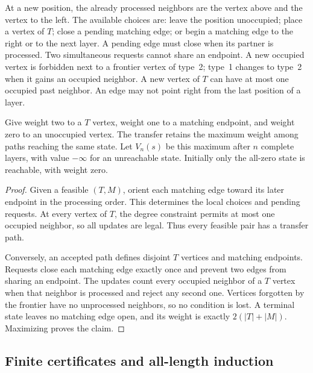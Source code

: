 \documentclass[11pt]{article}
\newtheorem{lemma}[theorem]{Lemma}
\theoremstyle{definition}
\theoremstyle{remark}
\newcommand{\Om}{\Omega}
\begin{document}
At a new position, the already processed neighbors are the vertex above
and the vertex to the left. The available choices are: leave the position
unoccupied; place a vertex of $T$; close a pending matching edge; or begin
a matching edge to the right or to the next layer. A pending edge must
close when its partner is processed. Two simultaneous requests cannot
share an endpoint. A new occupied vertex is forbidden next to a frontier
vertex of type~2; type~1 changes to type~2 when it gains an occupied
neighbor. A new vertex of $T$ can have at most one occupied past neighbor.
An edge may not point right from the last position of a layer.

Give weight two to a $T$ vertex, weight one to a matching endpoint, and
weight zero to an unoccupied vertex. The transfer retains the maximum
weight among paths reaching the same state. Let $V_n(s)$ be this maximum
after $n$ complete layers, with value $-\infty$ for an unreachable state.
Initially only the all-zero state is reachable, with weight zero.

\begin{proof}
Given a feasible $(T,M)$, orient each matching edge toward its later
endpoint in the processing order. This determines the local choices and
pending requests. At every vertex of $T$, the degree constraint permits
at most one occupied neighbor, so all updates are legal. Thus every
feasible pair has a transfer path.

Conversely, an accepted path defines disjoint $T$ vertices and matching
endpoints. Requests close each matching edge exactly once and prevent
two edges from sharing an endpoint. The updates count every occupied
neighbor of a $T$ vertex when that neighbor is processed and reject any
second one. Vertices forgotten by the frontier have no unprocessed
neighbors, so no condition is lost. A terminal state leaves no matching
edge open, and its weight is exactly $2(|T|+|M|)$. Maximizing proves the
claim.
\end{proof}

\subsection{Finite certificates and all-length induction}
\end{document}
